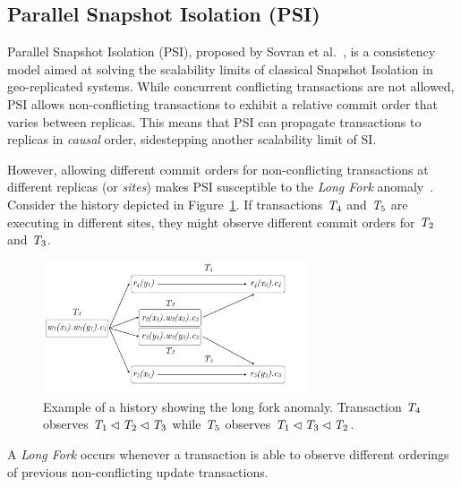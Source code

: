 \subsection{Parallel Snapshot Isolation (PSI)}
\label{sect:psi}

Parallel Snapshot Isolation (PSI), proposed by Sovran et al.~\citep{psi-intro}, is a consistency model aimed at solving the scalability limits of classical Snapshot Isolation in geo-replicated systems. While concurrent conflicting transactions are not allowed, PSI allows non-conflicting transactions to exhibit a relative commit order that varies between replicas. This means that PSI can propagate transactions to replicas in \emph{causal} order, sidestepping another scalability limit of SI.

However, allowing different commit orders for non-conflicting transactions at different replicas (or \emph{sites}) makes PSI susceptible to the \emph{Long Fork} anomaly~\citep{psi-intro}. Consider the history depicted in Figure~\ref{fig:long_fork_history}. If transactions $\mathit{T}_4$ and $\mathit{T}_5$ are executing in different sites, they might observe different commit orders for $\mathit{T}_2$ and $\mathit{T}_3$.

\begin{figure}[h]
  \centering
  \includegraphics[width=0.7\textwidth]{figures/long_fork_hist.pdf}
  \caption{Example of a history showing the long fork anomaly. Transaction $\mathit{T}_4$ observes $\mathit{T}_1 \lhd \mathit{T}_2 \lhd \mathit{T}_3$ while $\mathit{T}_5$ observes $\mathit{T}_1 \lhd \mathit{T}_3 \lhd \mathit{T}_2$.}
  \label{fig:long_fork_history}
\end{figure}

\begin{definition}
A \emph{Long Fork} occurs whenever a transaction is able to observe different orderings of previous non-conflicting update transactions.
\end{definition}

